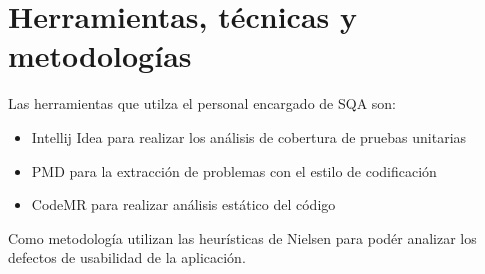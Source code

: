 \section{Herramientas, técnicas y metodologías}

Las herramientas que utilza el personal encargado de SQA son:
\begin{itemize}
    \item Intellij Idea para realizar los análisis de cobertura de pruebas unitarias
    \item PMD para la extracción de problemas con el estilo de codificación
    \item CodeMR para realizar análisis estático del código
\end{itemize}

Como metodología utilizan las heurísticas de Nielsen para podér analizar los defectos de usabilidad de la aplicación.

\begin{comment}
Describir el plan de calidad.
Máximo: 1 página.


1.
propósito y alcance del plan.
2.
descripción de los productos del trabajo (modelos, documentos,
código fuente, etc.) que se ubiquen dentro del ámbito del QA.
3.
estándares y prácticas aplicables que se utilicen durante el proceso
del software.
4.
acciones y tareas de QA (incluidas revisiones y auditorías) y su
ubicación en el proceso del software.
5.
herramientas y métodos que den apoyo a las acciones y tareas de
ACS (aseguramiento de la calidad del software).
6.
procedimientos para la administración de la configuración del
software.
7.
métodos para mantener todos los registros relacionados con QA.
8.
roles y responsabilidades relacionados con la función de calidad.

IEEE Std 730-1998
a) Purpose;
b) Reference documents;
c) Management;
d) Documentation;
e) Standards, practices, conventions, and metrics;
f) Reviews and audits;
g) Test;
h) Problem reporting and corrective action;
i) Tools, techniques, and methodologies;
j) Code control;
k) Media control;
l) Supplier control;
m) Records collection, maintenance, and retention;
n) Training;
o) Risk management.
\end{comment}